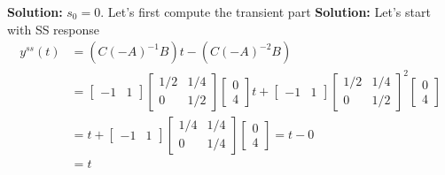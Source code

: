 \documentclass[twoside]{article}
\begin{document}
\textbf{Solution:} $s_0 = 0$. Let's first compute the transient part
%
\textbf{Solution:} Let's start with SS response 
\begin{align*} 
y^{ss}(t) &= \left( C \left(- A \right)^{-1} B \right) t  - \left( C \left(- A \right)^{-2} B \right) 
\\ &=  \begin{bmatrix} -1 & 1 \end{bmatrix}  \begin{bmatrix} 1/2 & 1/4 \\ 0 & 1/2 \end{bmatrix}  \begin{bmatrix} 0 \\ 4 \end{bmatrix} t 
+  \begin{bmatrix} -1 & 1 \end{bmatrix}  \begin{bmatrix} 1/2 & 1/4 \\ 0 & 1/2 \end{bmatrix}^2  \begin{bmatrix} 0 \\ 4 \end{bmatrix}
\\ &= t + \begin{bmatrix} -1 & 1 \end{bmatrix}  \begin{bmatrix} 1/4 & 1/4 \\ 0 & 1/4 \end{bmatrix}  \begin{bmatrix} 0 \\ 4 \end{bmatrix} = t - 0
\\ &= t
\end{align*}
\end{document}

